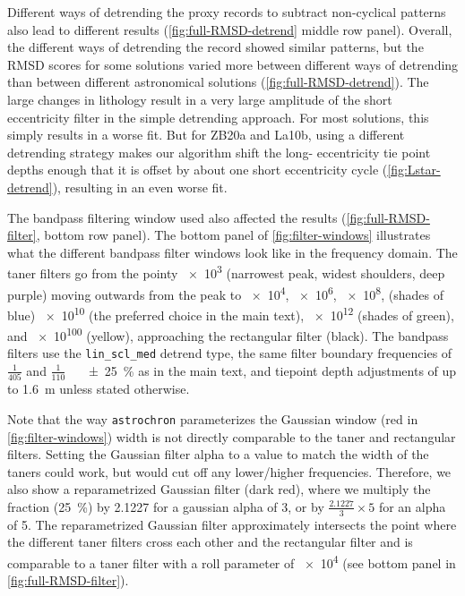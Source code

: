 \documentclass[draft]{agujournal2019}
\begin{document}
Different ways of detrending the proxy records to subtract non-cyclical patterns also lead to different results (\cref{fig:full-RMSD-detrend} middle row panel).
Overall, the different ways of detrending the record showed similar patterns, but the \gls{RMSD} scores for some solutions varied more between different ways of detrending than between different astronomical solutions (\cref{fig:full-RMSD-detrend}).
The large changes in lithology result in a very large amplitude of the short eccentricity filter in the simple detrending approach.
For most solutions, this simply results in a worse fit.
But for ZB20a and La10b, using a different detrending strategy makes our algorithm shift the long- eccentricity tie point depths enough that it is offset by about one short eccentricity cycle (\cref{fig:Lstar-detrend}), resulting in an even worse fit.

The bandpass filtering window used also affected the results (\cref{fig:full-RMSD-filter}, bottom row panel).
The bottom panel of \cref{fig:filter-windows} illustrates what the different bandpass filter windows look like in the frequency domain.
The taner filters go from the pointy \num{e3} (narrowest peak, widest shoulders, deep purple)
moving outwards from the peak to \num{e4}, \num{e6}, \num{e8}, (shades of blue)
\num{e10} (the preferred choice in the main text),
\num{e12} (shades of green), and \num{e100} (yellow),
approaching the rectangular filter (black).
The bandpass filters use the \texttt{lin\_scl\_med} detrend type,
the same filter boundary frequencies of \(\frac{1}{405}\) and \(\frac{1}{110}\)~\si[per-mode=power]{\per\kiloyear} \qty{\pm25}{\percent} as in the main text,
and tiepoint depth adjustments of up to \qty{1.6}{\metre} unless stated otherwise.

Note that the way \texttt{astrochron} parameterizes the Gaussian window (red in \cref{fig:filter-windows}) width is not directly comparable to the taner and rectangular filters.
Setting the Gaussian filter alpha to a value to match the width of the taners could work, but would cut off any lower/higher frequencies.
Therefore, we also show a reparametrized Gaussian filter (dark red),
where we multiply the fraction (\qty{25}{\percent})
by \num{2.1227} for a gaussian alpha of 3,
or by \(\frac{2.1227}{3}\times5\) for an alpha of 5.
The reparametrized Gaussian filter approximately intersects the point where the different taner filters cross each other and the rectangular filter and is comparable to a taner filter with a roll parameter of \num{e4} (see bottom panel in \cref{fig:full-RMSD-filter}).
\end{document}
